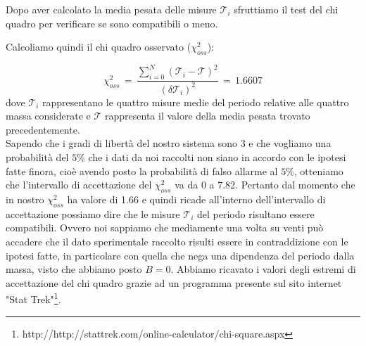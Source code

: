 Dopo aver calcolato la media pesata delle misure $\mathcal{T}_i$ sfruttiamo il test del chi quadro per verificare se sono compatibili o meno.


%
Calcoliamo quindi il chi quadro osservato ($\chi_{oss}^2$):

\begin{equation*}
	\chi_{oss}^2 \,=\, \frac{\sum_{i=0}^{N} (\mathcal{T}_i - \mathcal{T})^2}{(\delta \mathcal{T}_i)^2} \,=\, 1.6607
\end{equation*}
%
dove $\mathcal{T}_i$ rappresentano le quattro misure medie del periodo relative alle quattro massa considerate e $\mathcal{T}$ rappresenta il valore della media pesata trovato precedentemente.\\

Sapendo che i gradi di libertà del nostro sistema sono 3 e che vogliamo una probabilità del $5\%$ che i dati da noi raccolti non siano in accordo con le ipotesi fatte finora, cioè avendo posto la probabilità di falso allarme al $5\%$, otteniamo che l'intervallo di accettazione del $\chi_{oss}^2$ va da 0 a 7.82. Pertanto dal momento che in nostro $\chi_{oss}^2$ ha valore di 1.66 e quindi ricade all'interno dell'intervallo di accettazione possiamo dire che le misure $\mathcal{T}_i$ del periodo risultano essere compatibili. Ovvero noi sappiamo che mediamente una volta su venti può accadere che il dato sperimentale raccolto risulti essere in contraddizione con le ipotesi fatte, in particolare con quella che nega una dipendenza del periodo dalla massa, visto che abbiamo posto $B = 0$.
Abbiamo ricavato i valori degli estremi di accettazione del chi quadro grazie ad un programma presente sul sito internet "Stat Trek"\footnote{http://http://stattrek.com/online-calculator/chi-square.aspx}.